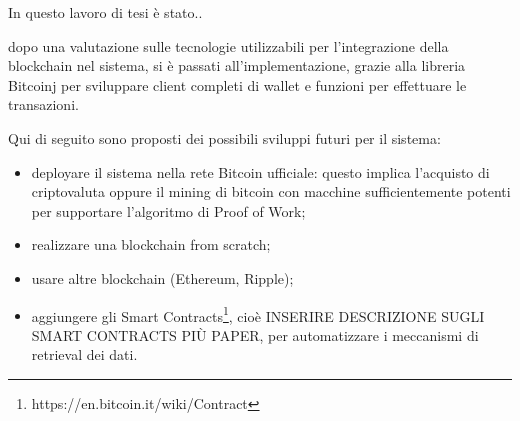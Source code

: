 In questo lavoro di tesi è stato..

dopo una valutazione sulle tecnologie utilizzabili per l'integrazione della blockchain nel sistema, si è passati all'implementazione, grazie alla libreria Bitcoinj per sviluppare client completi di wallet e funzioni per effettuare le transazioni.


Qui di seguito sono proposti dei possibili sviluppi futuri per il sistema: 
\begin{itemize}
    \item deployare il sistema nella rete Bitcoin ufficiale: questo implica l'acquisto di criptovaluta oppure il mining di bitcoin con macchine sufficientemente potenti per supportare l'algoritmo di Proof of Work;
    \item realizzare una blockchain from scratch;
    \item usare altre blockchain (Ethereum, Ripple);
    \item aggiungere gli Smart Contracts\footnote{https://en.bitcoin.it/wiki/Contract}, cioè INSERIRE DESCRIZIONE SUGLI SMART CONTRACTS PIÙ PAPER, per automatizzare i meccanismi di retrieval dei dati.
\end{itemize}
